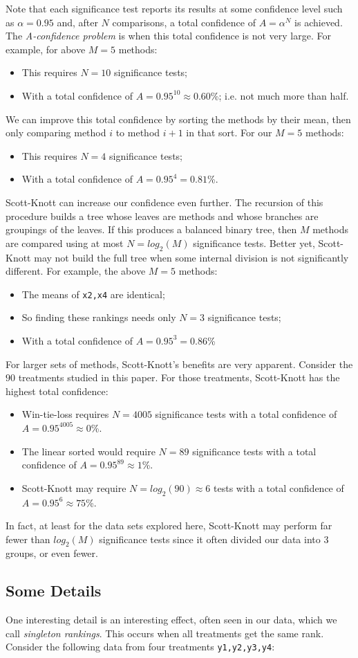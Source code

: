 \documentclass{sig-alternate}
\newcommand{\bi}{\begin{itemize}}
\newcommand{\ei}{\end{itemize}}
\begin{document}
Note that each significance
test reports its results at some
confidence level such as $\alpha=0.95$ and, after $N$
comparisons, a total confidence
of $A=\alpha^N$ is achieved.
The {\em A-confidence problem} is when this total confidence is not very large.
For example, for above $M=5$ methods:
\bi
\item  This requires $N=10$ significance tests;
\item With a total confidence of $A=0.95^{10}\approx 0.60$\%; i.e. not much more than half.
\ei
We can improve this total confidence by  sorting the 
methods by their mean, then 
only comparing  method $i$
to  method $i+1$ in that sort. For our $M=5$ methods:
\bi
\item  This requires $N=4$ significance tests;
\item With a total confidence of  $A=0.95^{4}=0.81$\%.
\ei
Scott-Knott can increase our confidence even further. The recursion of this
procedure builds a tree whose leaves are methods
 and whose  branches
are groupings of the leaves. If this produces a balanced binary tree, 
then $M$ methods
are compared using at most $N=log_2(M)$ significance tests. Better yet,  Scott-Knott may not
build the full tree when  some internal division is not significantly
different. 
For example, the above $M=5$ methods:
\bi
\item The means of {\tt x2,x4} are identical;
\item So finding these rankings needs only $N=3$ significance tests;
\item With a total confidence of $A=0.95^{3}=0.86$\%
\ei
For larger sets of methods, Scott-Knott's benefits are  very apparent. Consider
the $90$ treatments studied in this paper.
For those treatments, Scott-Knott has the highest
total confidence:
\bi
\item Win-tie-loss requires $N=4005$ significance tests with 
a total confidence of $A=0.95^{4005}\approx 0$\%.
\item The linear sorted would require $N=89$ 
significance tests with a total confidence of $A=0.95^{89}\approx 1$\%.
\item Scott-Knott may  require $N=log_2(90)\approx 6$ tests with a total confidence of
$A=0.95^{6}\approx 75$\%.
\ei
In fact, at least for the data sets explored here, Scott-Knott may perform far fewer than
$log_2(M)$ significance tests since it often divided our data into 3 groups, or even fewer.

\subsection{Some Details}\label{sect:blur}
One interesting detail is an interesting effect, often seen in our data, which we call  {\em singleton rankings}.
This occurs when  all treatments get the same rank.
Consider the following data from four treatments {\tt y1,y2,y3,y4}:
\end{document}
